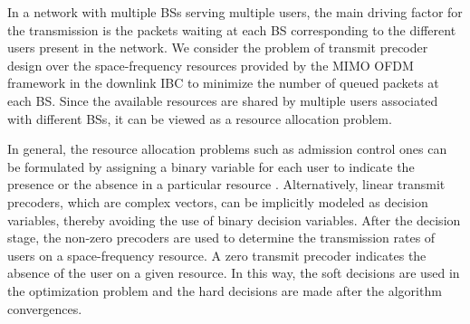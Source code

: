 In a network with multiple \acp{BS} serving multiple users, the main driving factor for the transmission is the packets waiting at each \ac{BS} corresponding to the different users present in the network. We consider the problem of transmit precoder design over the space-frequency resources provided by the \ac{MIMO} \ac{OFDM} framework in the downlink \ac{IBC} to minimize the number of queued packets at each \ac{BS}. Since the available resources are shared by multiple users associated with different \acp{BS}, it can be viewed as a resource allocation problem.

In general, the resource allocation problems such as admission control ones can be formulated by assigning a binary variable for each user to indicate the presence or the absence in a particular resource \cite{admission_control}. Alternatively, linear transmit precoders, which are complex vectors, can be implicitly modeled as decision variables, thereby avoiding the use of binary decision variables. After the decision stage, the non-zero precoders are used to determine the transmission rates of users on a space-frequency resource. A zero transmit precoder indicates the absence of the user on a given resource. In this way, the soft decisions are used in the optimization problem and the hard decisions are made after the algorithm convergences.


